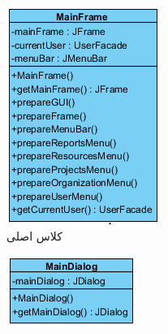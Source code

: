 \begin{figure}[H]
	\centering
	\begin{subfigure}[b]{0.3\textwidth}
		\includegraphics[width=\textwidth]{img/class-design/ui/MainFrame}
		\caption{کلاس اصلی}
	\end{subfigure}
		\centering
		\begin{subfigure}[b]{0.3\textwidth}
			\includegraphics[width=\textwidth]{img/class-design/ui/MainDialog}

\end{subfigure}
\end{figure}
